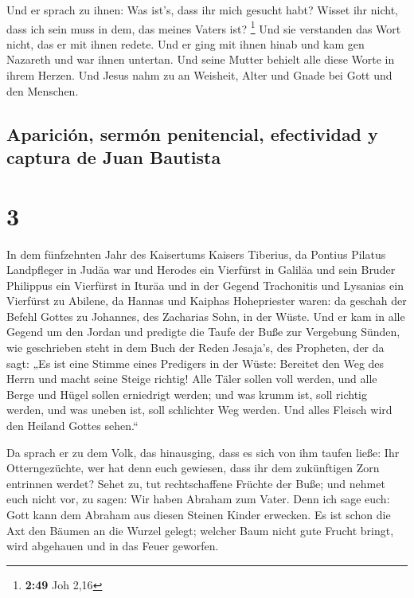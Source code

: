  Und er sprach zu ihnen: Was ist's, dass ihr mich gesucht
habt? Wisset ihr nicht, dass ich sein muss in dem, das meines Vaters
ist? \footnote{\textbf{2:49} Joh 2,16}  Und sie
verstanden das Wort nicht, das er mit ihnen redete.  Und
er ging mit ihnen hinab und kam gen Nazareth und war ihnen untertan. Und
seine Mutter behielt alle diese Worte in ihrem Herzen. 
Und Jesus nahm zu an Weisheit, Alter und Gnade bei Gott und den
Menschen.

\hypertarget{apariciuxf3n-sermuxf3n-penitencial-efectividad-y-captura-de-juan-bautista}{%
\subsection{Aparición, sermón penitencial, efectividad y captura de Juan
Bautista}\label{apariciuxf3n-sermuxf3n-penitencial-efectividad-y-captura-de-juan-bautista}}

\hypertarget{section-2}{%
\section{3}\label{section-2}}

 In dem fünfzehnten Jahr des Kaisertums Kaisers Tiberius,
da Pontius Pilatus Landpfleger in Judäa war und Herodes ein Vierfürst in
Galiläa und sein Bruder Philippus ein Vierfürst in Ituräa und in der
Gegend Trachonitis und Lysanias ein Vierfürst zu Abilene, 
da Hannas und Kaiphas Hohepriester waren: da geschah der Befehl Gottes
zu Johannes, des Zacharias Sohn, in der Wüste.  Und er kam
in alle Gegend um den Jordan und predigte die Taufe der Buße zur
Vergebung Sünden,  wie geschrieben steht in dem Buch der
Reden Jesaja's, des Propheten, der da sagt: „Es ist eine Stimme eines
Predigers in der Wüste: Bereitet den Weg des Herrn und macht seine
Steige richtig!  Alle Täler sollen voll werden, und alle
Berge und Hügel sollen erniedrigt werden; und was krumm ist, soll
richtig werden, und was uneben ist, soll schlichter Weg werden.
 Und alles Fleisch wird den Heiland Gottes sehen.``

 Da sprach er zu dem Volk, das hinausging, dass es sich
von ihm taufen ließe: Ihr Otterngezüchte, wer hat denn euch gewiesen,
dass ihr dem zukünftigen Zorn entrinnen werdet?  Sehet zu,
tut rechtschaffene Früchte der Buße; und nehmet euch nicht vor, zu
sagen: Wir haben Abraham zum Vater. Denn ich sage euch: Gott kann dem
Abraham aus diesen Steinen Kinder erwecken.  Es ist schon
die Axt den Bäumen an die Wurzel gelegt; welcher Baum nicht gute Frucht
bringt, wird abgehauen und in das Feuer geworfen.

